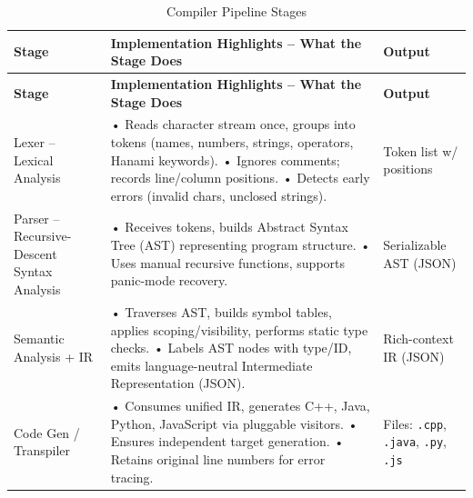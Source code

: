 \documentclass[conference]{IEEEtran}
\begin{document}
\onecolumn
\begin{longtable}{|>{\raggedright\arraybackslash}p{1.8cm}|>{\raggedright\arraybackslash}p{3.5cm}|>{\raggedright\arraybackslash}p{1.8cm}|}
\caption{Compiler Pipeline Stages} \label{table:pipeline} \\ %
\hline
\textbf{Stage} & \textbf{Implementation Highlights – What the Stage Does} & \textbf{Output} \\
\hline
\endfirsthead
\hline
\textbf{Stage} & \textbf{Implementation Highlights – What the Stage Does} & \textbf{Output} \\
\hline
\endhead
\hline
\endfoot
\hline
\endlastfoot
Lexer – Lexical Analysis &
• Reads character stream once, groups into tokens (names, numbers, strings, operators, Hanami keywords). \newline
• Ignores comments; records line/column positions. \newline
• Detects early errors (invalid chars, unclosed strings). &
Token list w/ positions \\
\hline
Parser – Recursive-Descent Syntax Analysis &
• Receives tokens, builds Abstract Syntax Tree (AST) representing program structure. \newline
• Uses manual recursive functions, supports panic-mode recovery. &
Serializable AST (JSON) \\
\hline
Semantic Analysis + IR &
• Traverses AST, builds symbol tables, applies scoping/visibility, performs static type checks. \newline
• Labels AST nodes with type/ID, emits language-neutral Intermediate Representation (JSON). &
Rich-context IR (JSON) \\
\hline
Code Gen / Transpiler &
• Consumes unified IR, generates C++, Java, Python, JavaScript via pluggable visitors. \newline
• Ensures independent target generation. \newline
• Retains original line numbers for error tracing. &
Files: \texttt{.cpp}, \texttt{.java}, \texttt{.py}, \texttt{.js} \\
\hline
\end{longtable}
\twocolumn
\end{document}
